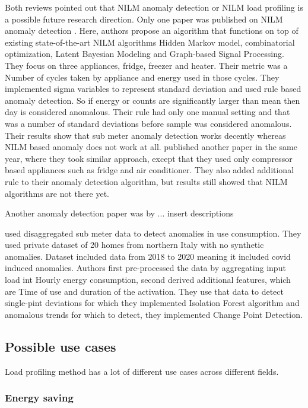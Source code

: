 \documentclass[
11pt, %
english, %
singlespacing, %
headsepline, %
]{MastersDoctoralThesis} %
\begin{document}
Both reviews pointed out that NILM anomaly detection or NILM load profiling is a possible future research direction.
Only one paper was published on NILM anomaly detection \cite{NILMAD2019}. Here, authors propose an algorithm
that functions on top of existing state-of-the-art NILM algorithms Hidden Markov model,
combinatorial optimization, Latent Bayesian Modeling and Graph-based Signal Processing.
They focus on three appliances, fridge, freezer and heater. Their metric was a Number of cycles taken by appliance and energy used in those cycles. 
They implemented sigma variables to represent standard deviation 
and used rule based anomaly detection. So if energy or counts are significantly larger than mean then day is considered anomalous.
Their rule had only one manual setting and that was a number of standard deviations before sample was considered anomalous.
Their results show that sub meter anomaly detection works decently whereas NILM based anomaly does not work at all. 
\cite{NILMAD22019} published another paper in the same year, where they took similar approach, except that they used 
only compressor based appliances such as fridge and air conditioner. They also added additional rule to their anomaly 
detection algorithm, but results still showed that NILM algorithms are not there yet. 

Another anomaly detection paper was by \cite{NILMAD2021}... insert descriptions

\cite{Castangia2021} used disaggregated sub meter data to detect anomalies in use consumption.
They used private dataset of 20 homes from northern Italy with no synthetic anomalies. 
Dataset included data from 2018 to 2020 meaning it included covid induced anomalies. 
Authors first pre-processed the data by aggregating input load int Hourly energy consumption, 
second derived additional features, which are Time of use and duration of the activation.
They use that data to detect single-pint deviations for which they implemented Isolation Forest algorithm and
anomalous trends for which to detect, they implemented Change Point Detection. 

\subsection{Possible use cases}

Load profiling method has a lot of different use cases across different fields.

\subsubsection{Energy saving}
\end{document}
